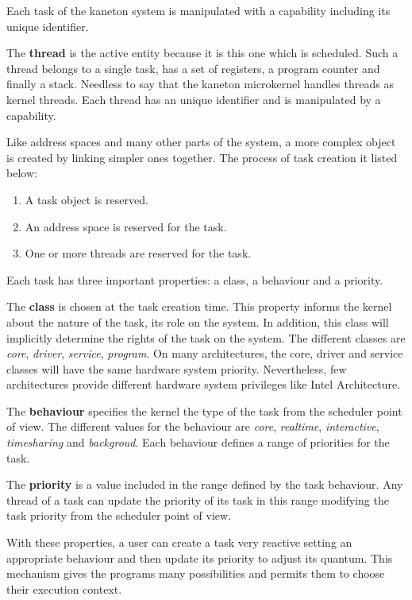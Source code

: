 \begin{multicols}{2}
Each task of the kaneton system is manipulated with a capability including
its unique identifier.

The \textbf{thread} is the active entity because it is this one which is
scheduled. Such a thread belongs to a single task, has a set of registers,
a program counter and finally a stack. Needless to say that the kaneton
microkernel handles threads as kernel threads. Each thread has an unique
identifier and is manipulated by a capability.

Like address spaces and many other parts of the system, a more complex
object is created by linking simpler ones together. The process of task creation
it listed below:

\begin{enumerate}
  \item
    A task object is reserved.
  \item
    An address space is reserved for the task.
  \item
    One or more threads are reserved for the task.
\end{enumerate}

Each task has three important properties: a class, a behaviour and a priority.

The \textbf{class} is chosen at the task creation time. This property
informs the kernel about the nature of the task, its role on the system.
In addition, this class will implicitly determine the rights of the task
on the system. The different classes are \textit{core}, \textit{driver},
\textit{service}, \textit{program}. On many architectures, the core, driver
and service classes will have the same hardware system priority.
Nevertheless, few architectures provide different hardware system privileges
like Intel Architecture.

The \textbf{behaviour} specifies the kernel the type of the task from the
scheduler point of view. The different values for the behaviour are
\textit{core}, \textit{realtime}, \textit{interactive}, \textit{timesharing}
and \textit{backgroud}. Each behaviour defines a range of priorities for the
task.

The \textbf{priority} is a value included in the range defined by the
task behaviour. Any thread of a task can update the priority of its
task in this range modifying the task priority from the scheduler
point of view.

With these properties, a user can create a task very reactive setting an
appropriate behaviour and then update its priority to adjust its quantum.
This mechanism gives the programs many possibilities and permits them to
choose their execution context.


\end{multicols}
